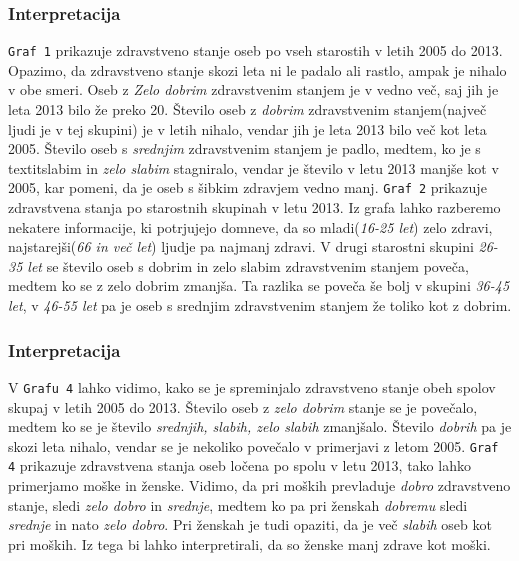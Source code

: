 \documentclass[11pt,a4paper]{article}
\begin{document}
\subsubsection{Interpretacija}
\verb+Graf 1+ prikazuje zdravstveno stanje oseb po vseh starostih v letih 2005 do 2013. Opazimo, da zdravstveno stanje skozi leta ni le padalo ali rastlo, ampak je nihalo v obe smeri. Oseb z \textit{Zelo dobrim} zdravstvenim stanjem je v vedno več, saj jih je leta 2013 bilo že preko 20. Število oseb  z \textit{dobrim} zdravstvenim stanjem(največ ljudi je v tej skupini) je v letih nihalo, vendar jih je leta 2013 bilo več kot leta 2005. Število oseb s \textit{srednjim} zdravstvenim stanjem je padlo, medtem, ko je s textit{slabim} in \textit{zelo slabim} stagniralo, vendar je število v letu 2013 manjše kot v 2005, kar pomeni, da je oseb s šibkim zdravjem vedno manj.
\verb+Graf 2+ prikazuje zdravstvena stanja po starostnih skupinah v letu 2013. Iz grafa lahko razberemo nekatere informacije, ki potrjujejo domneve, da so mladi(\textit{16-25 let}) zelo zdravi, najstarejši(\textit{66 in več let}) ljudje pa najmanj zdravi. V drugi starostni skupini \textit{26-35 let} se število oseb s dobrim in zelo slabim zdravstvenim stanjem poveča, medtem ko se z zelo dobrim zmanjša. Ta razlika se poveča še bolj v skupini \textit{36-45 let}, v \textit{46-55 let} pa je oseb s srednjim zdravstvenim stanjem že toliko kot z dobrim.

\subsubsection{Interpretacija}
V \verb+Grafu 4+ lahko vidimo, kako se je spreminjalo zdravstveno stanje obeh spolov skupaj v letih 2005 do 2013. Število oseb z  \textit{zelo dobrim} stanje se je povečalo, medtem ko se je število \textit{srednjih, slabih, zelo slabih} zmanjšalo. Število \textit{dobrih} pa je skozi leta nihalo, vendar se je nekoliko povečalo v primerjavi z letom 2005.
\verb+Graf 4+ prikazuje zdravstvena stanja oseb ločena po spolu v letu 2013, tako lahko primerjamo moške in ženske. Vidimo, da pri moških prevladuje \textit{dobro} zdravstveno stanje, sledi \textit{zelo dobro} in \textit{srednje}, medtem ko pa pri ženskah \textit{dobremu} sledi \textit{srednje} in nato \textit{zelo dobro}. Pri ženskah je tudi opaziti, da je več \textit{slabih} oseb kot pri moških. Iz tega bi lahko interpretirali, da so ženske manj zdrave kot moški.



\end{document}
